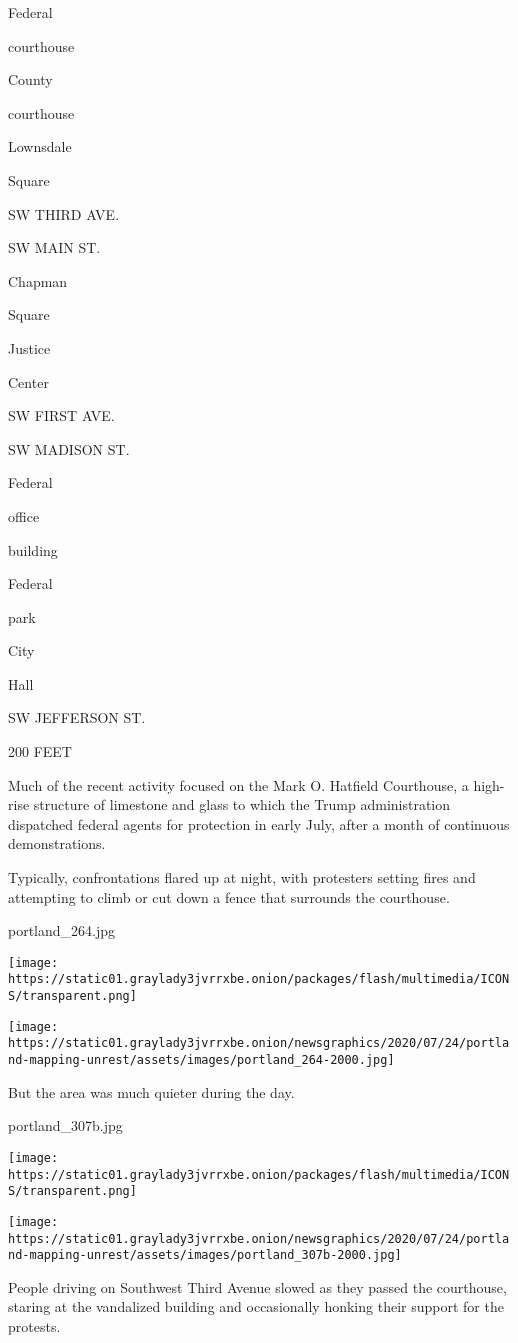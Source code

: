 Federal

courthouse

County

courthouse

Lownsdale

Square

SW THIRD AVE.

SW MAIN ST.

Chapman

Square

Justice

Center

SW FIRST AVE.

SW MADISON ST.

Federal

office

building

Federal

park

City

Hall

SW JEFFERSON ST.

200 FEET

Much of the recent activity focused on the Mark O. Hatfield Courthouse,
a high-rise structure of limestone and glass to which the Trump
administration dispatched federal agents for protection in early July,
after a month of continuous demonstrations.

Typically, confrontations flared up at night, with protesters setting
fires and attempting to climb or cut down a fence that surrounds the
courthouse.

portland\_264.jpg

\texttt{[image: https://static01.graylady3jvrrxbe.onion/packages/flash/multimedia/ICONS/transparent.png]}

\texttt{[image: https://static01.graylady3jvrrxbe.onion/newsgraphics/2020/07/24/portland-mapping-unrest/assets/images/portland\_264-2000.jpg]}

But the area was much quieter during the day.

portland\_307b.jpg

\texttt{[image: https://static01.graylady3jvrrxbe.onion/packages/flash/multimedia/ICONS/transparent.png]}

\texttt{[image: https://static01.graylady3jvrrxbe.onion/newsgraphics/2020/07/24/portland-mapping-unrest/assets/images/portland\_307b-2000.jpg]}

People driving on Southwest Third Avenue slowed as they passed the
courthouse, staring at the vandalized building and occasionally honking
their support for the protests.

